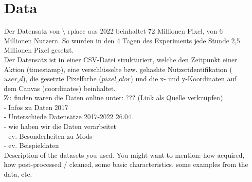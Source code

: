 \section{Data} \label{data}  %

Der Datensatz von $\setminus$ rplace aus 2022 beinhaltet 72 Millionen Pixel, von 6 Millionen Nutzern. So wurden in den 4 Tagen des Experiments jede Stunde 2,5 Millionen Pixel gesetzt. \\
Der Datensatz ist in einer CSV-Datei strukturiert, welche den Zeitpunkt einer Aktion (timestamp), eine verschlüsselte bzw. gehashte Nutzeridentifikation ($user_id$), die gesetzte Pixelfarbe ($pixel_color$) und die x- und y-Koordinaten auf dem Canvas (coordinates) beinhaltet. \\
Zu finden waren die Daten online unter: ??? (Link als Quelle verknüpfen)\\
- Infos zu Daten 2017\\
- Unterschiede Datensätze 2017-2022 26.04.\\
- wie haben wir die Daten verarbeitet\\
- ev. Besonderheiten zu Mods\\
- ev. Beispieldaten\\


Description of the datasets you used. You might want to mention: how acquired, how post-processed / cleaned, some basic characteristics, some examples from the data, etc.


